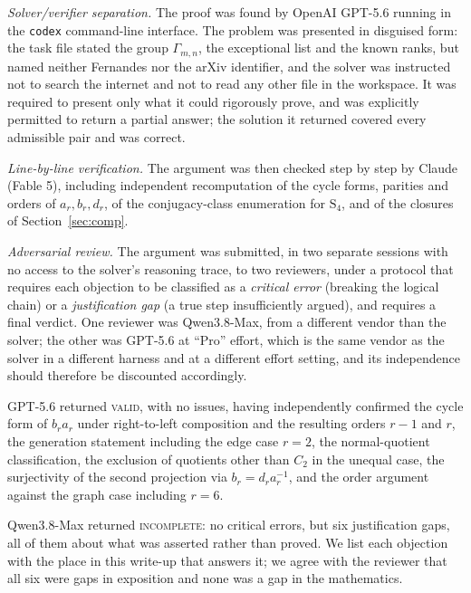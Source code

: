 \documentclass[11pt]{article}
\theoremstyle{plain}
\theoremstyle{definition}
\theoremstyle{remark}
\numberwithin{equation}{section}
\newcommand{\Sym}{\mathrm{S}}
\newcommand{\Gam}{\Gamma}
\begin{document}
\emph{Solver/verifier separation.} The proof was found by OpenAI GPT-5.6 running in the
\texttt{codex} command-line interface. The problem was presented in disguised form: the task
file stated the group $\Gam_{m,n}$, the exceptional list and the known ranks, but named neither
Fernandes nor the arXiv identifier, and the solver was instructed not to search the internet and
not to read any other file in the workspace. It was required to present only what it could
rigorously prove, and was explicitly permitted to return a partial answer; the solution it
returned covered every admissible pair and was correct.

\emph{Line-by-line verification.} The argument was then checked step by step by Claude
(Fable 5), including independent recomputation of the cycle forms, parities and orders of
$a_r,b_r,d_r$, of the conjugacy-class enumeration for $\Sym_4$, and of the closures of
Section~\ref{sec:comp}.

\emph{Adversarial review.} The argument was submitted, in two separate sessions with no access
to the solver's reasoning trace, to two reviewers, under a protocol that requires each objection
to be classified as a \emph{critical error} (breaking the logical chain) or a \emph{justification
gap} (a true step insufficiently argued), and requires a final verdict. One reviewer was
Qwen3.8-Max, from a different vendor than the solver; the other was GPT-5.6 at ``Pro'' effort,
which is the same vendor as the solver in a different harness and at a different effort setting,
and its independence should therefore be discounted accordingly.

GPT-5.6 returned \textsc{valid}, with no issues, having independently confirmed the cycle form of
$b_ra_r$ under right-to-left composition and the resulting orders $r-1$ and $r$, the generation
statement including the edge case $r = 2$, the normal-quotient classification, the exclusion of
quotients other than $C_2$ in the unequal case, the surjectivity of the second projection via
$b_r = d_ra_r^{-1}$, and the order argument against the graph case including $r = 6$.

Qwen3.8-Max returned \textsc{incomplete}: no critical errors, but six justification gaps, all of
them about what was asserted rather than proved. We list each objection with the place in this
write-up that answers it; we agree with the reviewer that all six were gaps in exposition and
none was a gap in the mathematics.
\end{document}
